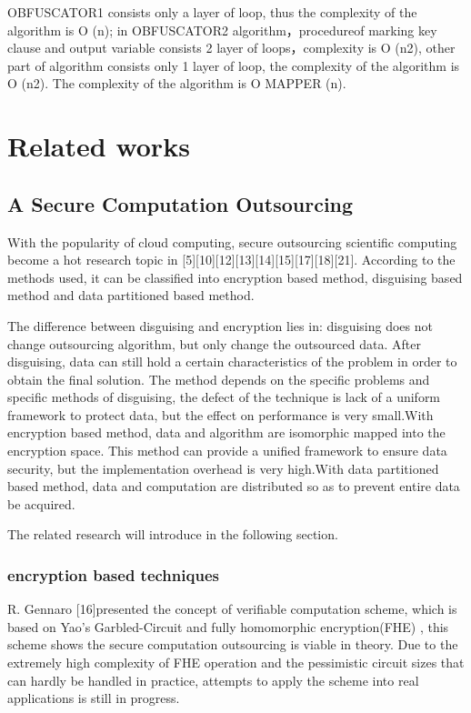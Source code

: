 \documentclass[runningheads,a4paper]{llncs}
\begin{document}
OBFUSCATOR1 consists only a layer of loop, thus the complexity of the algorithm is O (n); in OBFUSCATOR2 algorithm，procedureof marking key clause and output variable consists 2 layer of loops，complexity is O (n2), other part of algorithm consists only 1 layer of loop, the complexity of the algorithm is O (n2). The complexity of the algorithm is O MAPPER (n).
\section{Related works} 
\subsection{A Secure Computation Outsourcing}

With the popularity of cloud computing, secure outsourcing scientific computing become a hot research topic in [5][10][12][13][14][15][17][18][21]. According to the methods used, it can be classified into encryption based method, disguising based method and data partitioned based method.

The difference between disguising and encryption lies in: disguising does not change outsourcing algorithm, but only change the outsourced data. After disguising, data can still hold a certain characteristics of the problem in order to obtain the final solution. The method depends on the specific problems and specific methods of disguising, the defect of the technique is lack of a uniform framework to protect data, but the effect on performance is very small.With encryption based method, data and algorithm are isomorphic mapped into the encryption space. This method can provide a unified framework to ensure data security, but the implementation overhead is very high.With data partitioned based method, data and computation are distributed so as to prevent entire data be acquired.    

The related research will introduce in the following section.
\subsubsection{encryption based techniques}

R. Gennaro [16]presented the concept of verifiable computation scheme, which is based on Yao’s Garbled-Circuit and fully homomorphic encryption(FHE) , this scheme shows the secure computation outsourcing is viable in theory. Due to the extremely high complexity of FHE operation and the pessimistic circuit sizes that can hardly be handled in practice, attempts to apply the scheme into real applications is still in progress.
\end{document}
